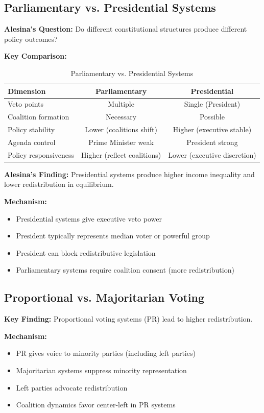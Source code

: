 \subsection{Parliamentary vs. Presidential Systems}

\textbf{Alesina's Question:} Do different constitutional structures produce different policy outcomes?

\textbf{Key Comparison:}

\begin{table}[h]
\centering
\caption{Parliamentary vs. Presidential Systems}
\label{tab:alesina-institutions}
\begin{tabular}{lcc}
\toprule
\textbf{Dimension} & \textbf{Parliamentary} & \textbf{Presidential} \\
\midrule
Veto points & Multiple & Single (President) \\
Coalition formation & Necessary & Possible \\
Policy stability & Lower (coalitions shift) & Higher (executive stable) \\
Agenda control & Prime Minister weak & President strong \\
Policy responsiveness & Higher (reflect coalitions) & Lower (executive discretion) \\
\bottomrule
\end{tabular}
\end{table}

\textbf{Alesina's Finding:} Presidential systems produce higher income inequality and lower redistribution in equilibrium.

\textbf{Mechanism:}
\begin{itemize}
\item Presidential systems give executive veto power
\item President typically represents median voter or powerful group
\item President can block redistributive legislation
\item Parliamentary systems require coalition consent (more redistribution)
\end{itemize}

\subsection{Proportional vs. Majoritarian Voting}

\textbf{Key Finding:} Proportional voting systems (PR) lead to higher redistribution.

\textbf{Mechanism:}
\begin{itemize}
\item PR gives voice to minority parties (including left parties)
\item Majoritarian systems suppress minority representation
\item Left parties advocate redistribution
\item Coalition dynamics favor center-left in PR systems
\end{itemize}

